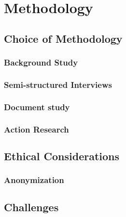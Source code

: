 \chapter{Methodology}

\section{Choice of Methodology}
\subsection{Background Study}
\subsection{Semi-structured Interviews}
\subsection{Document study}
\subsection{Action Research}

\section{Ethical Considerations}
\subsection{Anonymization}

\section{Challenges}
